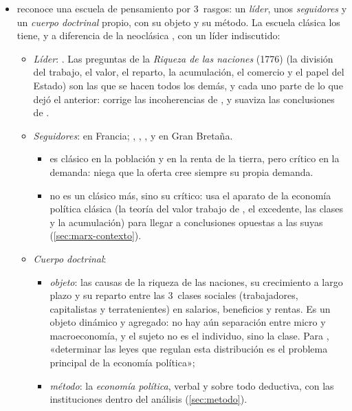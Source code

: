 \documentclass[11pt]{article}
\begin{document}
\begin{itemize}
\item {} reconoce una escuela de pensamiento por 3~rasgos: un \emph{líder}, unos \emph{seguidores} y un \emph{cuerpo doctrinal} propio, con su objeto y su método\nocite{Schumpeter1954History}. La escuela clásica los tiene, y a diferencia de la neoclásica , con un líder indiscutido:
  \begin{itemize}
  \item \emph{Líder}: . Las preguntas de la \emph{Riqueza de las naciones} (1776) (la división del trabajo, el valor, el reparto, la acumulación, el comercio y el papel del Estado) son las que se hacen todos los demás, y cada uno parte de lo que dejó el anterior:  corrige las incoherencias de , y  suaviza las conclusiones de .
  \item \emph{Seguidores}:  en Francia; , , ,  y  en Gran Bretaña.
    \begin{itemize}
    \item {} es clásico en la población y en la renta de la tierra, pero crítico en la demanda: niega que la oferta cree siempre su propia demanda.
    \item {} no es un clásico más, sino su crítico: usa el aparato de la economía política clásica (la teoría del valor trabajo de , el excedente, las clases y la acumulación) para llegar a conclusiones opuestas a las suyas\nocite{LandrethColander2006Historia} (\ref{sec:marx-contexto}).
    \end{itemize}
  \item \emph{Cuerpo doctrinal}:
    \begin{itemize}
    \item \emph{objeto}: las causas de la riqueza de las naciones, su crecimiento a largo plazo y su reparto entre las 3~clases sociales (trabajadores, capitalistas y terratenientes) en salarios, beneficios y rentas. Es un objeto dinámico y agregado: no hay aún separación entre micro y macroeconomía, y el sujeto no es el individuo, sino la clase. Para , «determinar las leyes que regulan esta distribución es el problema principal de la economía política»\nocite{Ricardo1817Principles};
    \item \emph{método}: la \emph{economía política}, verbal y sobre todo deductiva, con las instituciones dentro del análisis (\ref{sec:metodo}).
    \end{itemize}
  \end{itemize}
\end{itemize}
\end{document}
